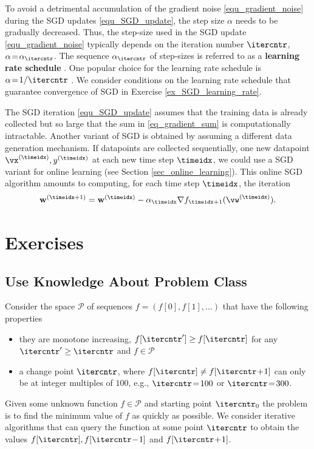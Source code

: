 \documentclass[12pt]{report}
\begin{document}
To avoid a detrimental accumulation of the gradient noise \eqref{equ_gradient_noise} 
during the SGD updates \eqref{equ_SGD_update}, the step size $\alpha$ needs to be gradually 
decreased. Thus, the step-size used in the SGD update \eqref{equ_gradient_noise}
typically depends on the iteration number $\itercntr$, $\alpha\!=\!\alpha_{\itercntr}$. 
The sequence $\alpha_{\itercntr}$ of step-sizes is referred to as a {\bf learning rate schedule} \cite[Chapter 8]{Goodfellow-et-al-2016}. 
One popular choice for the learning rate schedule is $\alpha\!=\!1/\itercntr$ \cite{Murata98astatistical}. 
We consider conditions on the learning rate schedule that guarantee convergence of 
SGD in Exercise \ref{ex_SGD_learning_rate}. 

The SGD iteration \eqref{equ_SGD_update} assumes that the training data is already 
collected but so large that the sum in \eqref{eq_gradient_sum} is computationally intractable. 
Another variant of SGD is obtained by assuming a different data generation 
mechanism. If datapoints are collected sequentially, one new datapoint $\vx^{(\timeidx)},y^{(\timeidx)}$ 
at each new time step $\timeidx$, we could use a SGD variant for online learning 
(see Section \ref{sec_online_learning}). This online SGD algorithm amounts to 
computing, for each time step $\timeidx$, the iteration 
\begin{equation}
\label{equ_SGD_update_timeiedx}
\mathbf{w}^{(\timeidx+1)} = \mathbf{w}^{(\timeidx)} - \alpha_{\timeidx} \nabla f_{\timeidx+1}(\vw^{(\timeidx)}).
\end{equation} 



\section{Exercises}

\subsection{Use Knowledge About Problem Class} 
Consider the space $\mathcal{P}$ of sequences $f = (f[0],f[1],\ldots)$ 
that have the following properties 
\begin{itemize} 
	\item they are monotone increasing, $f[\itercntr'] \geq f[\itercntr]$ for any $\itercntr' \geq \itercntr$ and $f \in \mathcal{P}$
	\item a change point $\itercntr$, where $f[\itercntr] \neq f[\itercntr\!+\!1]$ can only be at integer multiples of $100$, 
	e.g., $\itercntr\!=\!100$ or $\itercntr\!=\!300$. 
\end{itemize} 
Given some unknown function $f \in \mathcal{P}$ and starting 
point $\itercntr_{0}$ the problem is to find the minimum value of $f$ as 
quickly as possible. We consider iterative algorithms that can query
the function at some point $\itercntr$ to obtain the values $f[\itercntr], f[\itercntr\!-\!1]$ and $f[\itercntr\!+\!1]$. 
\end{document}
